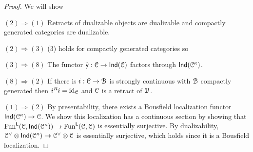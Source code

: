 \begin{proof}
    We will show 

    $(2)\Rightarrow(1)$ Retracts of dualizable objects are dualizable and compactly generated categories are dualizable. 

    $(2)\Rightarrow(3)$ (3) holds for compactly generated categories so 

    $(3)\Rightarrow(8)$ The functor $\hat{\mathsf{y}}:\EuScript{C}\to\mathsf{Ind}(\EuScript{C})$ factors through $\mathsf{Ind}(\EuScript{C}^{\kappa})$. 

    $(8)\Rightarrow(2)$ If there is $i:\EuScript{C}\to\EuScript{B}$ is strongly continuous with $\EuScript{B}$ compactly generated then $i^{R}i=\mathrm{id}_{\EuScript{C}}$ and $\EuScript{C}$ is a retract of $\EuScript{B}$. 

    $(1)\Rightarrow(2)$ By presentability, there exists a Bousfield localization functor $\mathsf{Ind}(\EuScript{C}^{\kappa})\to\EuScript{C}$. We show this localization has a continuous section by showing that $\mathrm{Fun}^{\mathsf{L}}(\EuScript{C},\mathsf{Ind}(\EuScript{C}^{\kappa}))\to\mathrm{Fun}^{\mathsf{L}}(\EuScript{C},\EuScript{C})$ is essentially surjective. By dualizability, $\EuScript{C}^{\vee}\otimes\mathsf{Ind}(\EuScript{C}^{\kappa})\to\EuScript{C}^{\vee}\otimes\EuScript{C}$ is essentially surjective, which holds since it is a Bousfield localization. 
\end{proof}